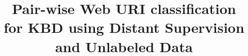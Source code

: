 \documentclass{sig-alternate-05-2015}
\begin{document}






%

\title{Pair-wise Web URI classification for KBD using Distant Supervision and Unlabeled Data}
%
%
%
%
%
\end{document}
